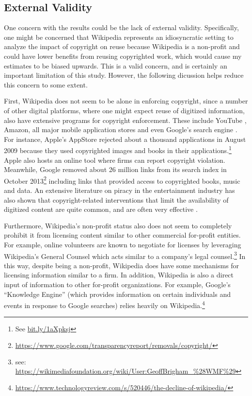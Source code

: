 \documentclass[11pt]{article}
\begin{document}
\subsection{External Validity}

One concern with the results could be the lack of external validity. Specifically, one might be concerned that Wikipedia represents an idiosyncratic setting to analyze the impact of copyright on reuse because Wikipedia is a non-profit and could have lower benefits from reusing copyrighted work, which would cause my estimates to be biased upwards. This is a valid concern, and is certainly an important limitation of this study. However, the following dicussion helps reduce this concern to some extent. 

First, Wikipedia does not seem to be alone in enforcing copyright, since a number of other digital platforms, where one might expect reuse of digitized information, also have extensive programs for copyright enforcement. These include YouTube \citep{seidenberg_copyright_2009}, Amazon, all major mobile application stores and even Google's search engine \citep{dillon_scott_google_2011}. For instance, Apple's AppStore rejected about a thousand applications in August 2009 because they used copyrighted images and books in their applications.\footnote{See \url{bit.ly/1aXpksj}} Apple also hosts an online tool where firms can report copyright violation. Meanwhile, Google removed about 26 million links from its search index in October 2013\footnote{\url{https://www.google.com/transparencyreport/removals/copyright/}} including links that provided access to copyrighted books, music and data. An extensive literature on piracy \citep{bechtold_digital_2004} in the entertainment industry has also shown that copyright-related interventions that limit the availability of digitized content are quite common, and are often very effective \citep{danaher_converting_2010, danaher_gone_2013}. 

Furthermore, Wikipedia's non-profit status also does not seem to completely prohibit it from licensing content similar to other commercial for-profit entities. For example, online volunteers are known to negotiate for licenses by leveraging Wikipedia's General Counsel which acts similar to a company's legal counsel.\footnote{see: \url{https://wikimediafoundation.org/wiki/User:GeoffBrigham_\%28WMF\%29}} In this way, despite being a non-profit, Wikipedia does have some mechanisms for licensing information similar to a firm. In addition, Wikipedia is also a direct input of information to other for-profit organizations. For example, Google's ``Knowledge Engine'' (which provides information on certain individuals and events in response to Google searches) relies heavily on Wikipedia.\footnote{\url{https://www.technologyreview.com/s/520446/the-decline-of-wikipedia/}}
\end{document}
